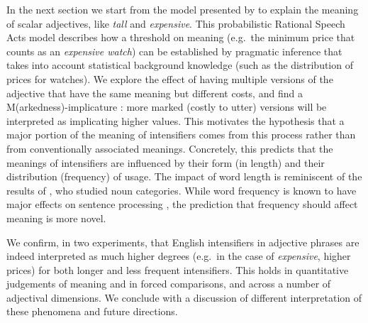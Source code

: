 \documentclass[10pt,letterpaper]{article}
\newcommand{\w}[1]{\emph{#1}}
\newcommand{\todo}[1]{{\color{red}#1}}
\begin{document}



In the next section we start from the model presented by  to explain the meaning of scalar adjectives, like \emph{tall} and \emph{expensive}. This probabilistic Rational Speech Acts \cite{frank,goodman} model describes how a threshold on meaning (e.g.~the minimum price that counts as an \emph{expensive watch}) can be established by pragmatic inference that takes into account statistical background knowledge (such as the distribution of prices for watches). We explore the effect of having multiple versions of the adjective that have the same meaning but different costs, and find a M(arkedness)-implicature \cite{levinson}: more marked (costly to utter) versions will be interpreted as implicating higher values.
This motivates the hypothesis that a major portion of the meaning of intensifiers comes from this process rather than from conventionally associated meanings. Concretely, this predicts that the meanings of intensifiers are influenced by their form (in length) and their distribution (frequency) of usage. The impact of word length is reminiscent of the results of , who studied noun categories. While word frequency is known to have major effects on sentence processing \cite[e.g.]{levy}, the prediction that frequency should affect meaning is more novel.

We confirm, in two experiments, that English intensifiers in adjective phrases are indeed interpreted as much higher degrees (e.g.~in the case of \w{expensive}, higher prices) for both longer and less frequent intensifiers. This holds in quantitative judgements of meaning and in forced comparisons, and across a number of adjectival dimensions. We conclude with a discussion of different interpretation of these phenomena and future directions.
\end{document}
